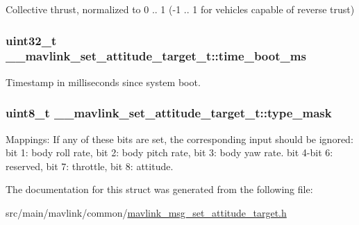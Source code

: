 Collective thrust, normalized to 0 .. 1 (-\/1 .. 1 for vehicles capable of reverse trust) 

\hypertarget{struct____mavlink__set__attitude__target__t_a66f709687537575563c2eb503447b2b0}{
\subsubsection[{time\+\_\+boot\+\_\+ms}]{\setlength{\rightskip}{0pt plus 5cm}uint32\+\_\+t \+\_\+\+\_\+mavlink\+\_\+set\+\_\+attitude\+\_\+target\+\_\+t\+::time\+\_\+boot\+\_\+ms}}\label{struct____mavlink__set__attitude__target__t_a66f709687537575563c2eb503447b2b0}


Timestamp in milliseconds since system boot. 

\hypertarget{struct____mavlink__set__attitude__target__t_a57076cfcacf9c295cc252a6478956f4b}{
\subsubsection[{type\+\_\+mask}]{\setlength{\rightskip}{0pt plus 5cm}uint8\+\_\+t \+\_\+\+\_\+mavlink\+\_\+set\+\_\+attitude\+\_\+target\+\_\+t\+::type\+\_\+mask}}\label{struct____mavlink__set__attitude__target__t_a57076cfcacf9c295cc252a6478956f4b}


Mappings\+: If any of these bits are set, the corresponding input should be ignored\+: bit 1\+: body roll rate, bit 2\+: body pitch rate, bit 3\+: body yaw rate. bit 4-\/bit 6\+: reserved, bit 7\+: throttle, bit 8\+: attitude. 



The documentation for this struct was generated from the following file\+:\begin{DoxyCompactItemize}
\item 
src/main/mavlink/common/\hyperlink{mavlink__msg__set__attitude__target_8h}{mavlink\+\_\+msg\+\_\+set\+\_\+attitude\+\_\+target.\+h}\end{DoxyCompactItemize}
